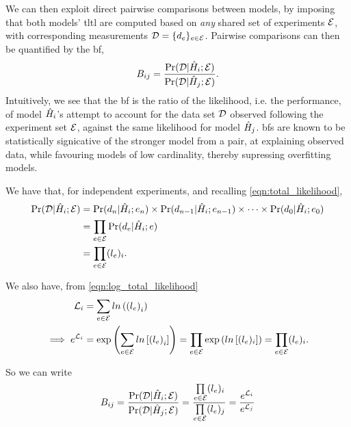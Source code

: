 We can then exploit direct pairwise comparisons between models,  
    by imposing that both models' \gls{tltl} are computed based 
    on \emph{any} shared set of experiments ${ \mathcal{E} }$, 
    with corresponding measurements ${ \mathcal{D} } = \{ d_{e}\}_{e \in { \mathcal{E} }}$.
Pairwise comparisons can then be quantified by the \gls{bf},
\begin{equation}
    \label{eqn:bayes_factors}
    B_{ij} = \frac{\Pr({ \mathcal{D} } | \hat{H}_i; { \mathcal{E} })}{\Pr({ \mathcal{D} } | \hat{H}_j; { \mathcal{E} })}.
\end{equation}
Intuitively, we see that the \gls{bf} is the ratio of the likelihood, i.e. the performance, 
    of model $\hat{H}_i$'s attempt to account for the data set ${ \mathcal{D} }$ observed following the 
    experiment set ${ \mathcal{E} }$, against the same likelihood for model $\hat{H}_j$.
\glspl{bf} are known to be statistically signicative of the stronger model 
    from a pair, at explaining observed data,
    while favouring models of low cardinality, thereby supressing overfitting models. 
\par 

We have that, for independent experiments, and recalling \cref{eqn:total_likelihood}, 
\begin{align}
    \begin{split}
        \Pr({ \mathcal{D} } | \hat{H}_i; { \mathcal{E} }) &= \Pr(d_n | \hat{H}_i; e_n) \times \Pr(d_{n-1} | \hat{H}_i; e_{n-1}) \times \dots \times \Pr(d_0 | \hat{H}_i; e_0) \\
        &= \prod_{e \in { \mathcal{E} }} \Pr(d_e | \hat{H}_i; e) \\
        &= \prod_{e \in { \mathcal{E} }} (l_{e})_i.
    \end{split}
\end{align}

We also have, from \cref{eqn:log_total_likelihood}
\begin{align}
    \label{eqn:log_likelihood}
    \begin{split}
        {\mathcal{L}}_{i} &= \sum_{e \in { \mathcal{E} }} ln\left(\left(l_{e}\right)_i\right) \\
        \implies e^{{\mathcal{L}}_{i}} &= \exp \left( \sum_{e \in { \mathcal{E} }} ln \left[ \left(l_{e}\right)_i\right] \right) 
        = \prod_{e \in { \mathcal{E} }} \exp \left( ln \left[ (l_{e})_i \right]  \right) 
        = \prod_{e \in { \mathcal{E} }} (l_{e})_i.
    \end{split}
\end{align}

So we can write 
\begin{align}
    \label{eqn:bf_by_ll}
    \begin{split}
        B_{ij} &= \frac{\Pr({ \mathcal{D} } | \hat{H}_i; { \mathcal{E} })}{\Pr({ \mathcal{D} } | \hat{H}_j; { \mathcal{E} })} 
        = \frac{ \prod\limits_{e \in { \mathcal{E} }} (l_{e})_i } {\prod\limits_{e \in { \mathcal{E} }} (l_{e})_j } 
        = \frac{e^{{\mathcal{L}}_{i}}}{e^{{\mathcal{L}}_{j}}} \\
    \end{split}
\end{align}

